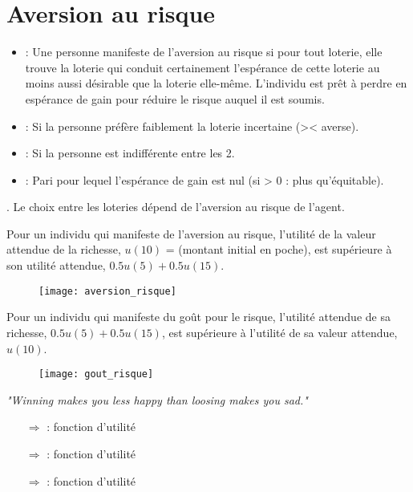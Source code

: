 \section{Aversion au risque}

\begin{itemize}
\item {} : Une personne manifeste de l'aversion au risque si pour tout loterie, elle trouve la loterie qui conduit certainement l'espérance de cette loterie au moins aussi désirable que la loterie elle-même. L'individu est prêt à perdre en espérance de gain pour réduire le risque auquel il est soumis.
\item {} : Si la personne préfère faiblement la loterie incertaine (>< averse).
\item {} : Si la personne est indifférente entre les 2.
\item {} : Pari pour lequel l'espérance de gain est nul (si > 0 : plus qu'équitable).
\end{itemize}
\warning {}. Le choix entre les loteries dépend de l'aversion au risque de l'agent.

Pour un individu qui manifeste de l'aversion au risque, l'utilité de la valeur attendue de la richesse, $u(10)$ = (montant initial en poche), est supérieure à son utilité attendue, $0.5u(5) + 0.5u(15)$.
\begin{figure}[H]
	\centering
	\texttt{[image: aversion\_risque]}
\end{figure}

Pour un individu qui manifeste du goût pour le risque, l'utilité attendue de sa richesse, $0.5u(5) + 0.5u(15)$, est supérieure à l'utilité de sa valeur attendue, $u(10)$.
\begin{figure}[H]
	\centering
	\texttt{[image: gout\_risque]}
\end{figure}

\textit{"Winning makes you less happy than loosing makes you sad."}
\begin{itemize}
\item[$\Rightarrow$]  : fonction d'utilité 
\item[$\Rightarrow$]  : fonction d'utilité 
\item[$\Rightarrow$]  : fonction d'utilité 
\end{itemize}

